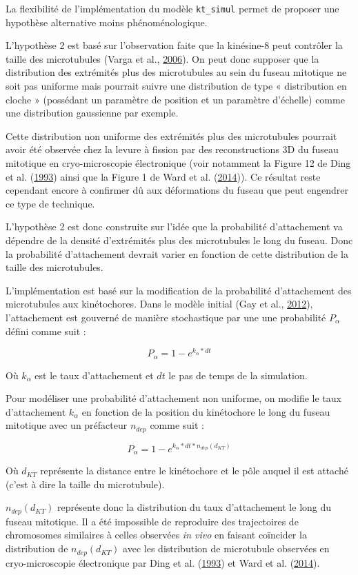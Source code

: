 \documentclass[12pt,a4paper,twoside,openright]{book}
\begin{document}
La flexibilité de l'implémentation du modèle \texttt{kt\_simul} permet
de proposer une hypothèse alternative moins phénoménologique.

L'hypothèse 2 est basé sur l'observation faite que la kinésine-8 peut
contrôler la taille des microtubules (Varga et al.,
\hyperref[ref-Varga2006]{2006}). On peut donc supposer que la
distribution des extrémités plus des microtubules au sein du fuseau
mitotique ne soit pas uniforme mais pourrait suivre une distribution de
type « distribution en cloche » (possédant un paramètre de position et
un paramètre d'échelle) comme une distribution gaussienne par exemple.

Cette distribution non uniforme des extrémités plus des microtubules
pourrait avoir été observée chez la levure à fission par des
reconstructions 3D du fuseau mitotique en cryo-microscopie électronique
(voir notamment la Figure 12 de Ding et al.
(\hyperref[ref-Ding1993a]{1993}) ainsi que la Figure 1 de Ward et al.
(\hyperref[ref-Ward2014]{2014})). Ce résultat reste cependant encore à
confirmer dû aux déformations du fuseau que peut engendrer ce type de
technique.

L'hypothèse 2 est donc construite sur l'idée que la probabilité
d'attachement va dépendre de la densité d'extrémités plus des
microtubules le long du fuseau. Donc la probabilité d'attachement
devrait varier en fonction de cette distribution de la taille des
microtubules.

L'implémentation est basé sur la modification de la probabilité
d'attachement des microtubules aux kinétochores. Dans le modèle initial
(Gay et al., \hyperref[ref-Gay2012a]{2012}), l'attachement est gouverné
de manière stochastique par une une probabilité \(P_{\alpha}\) défini
comme suit :

\[
P_{\alpha} = 1 - e^{k_{\alpha}*dt}
\]

Où \(k_{\alpha}\) est le taux d'attachement et \(dt\) le pas de temps de
la simulation.

Pour modéliser une probabilité d'attachement non uniforme, on modifie le
taux d'attachement \(k_{\alpha}\) en fonction de la position du
kinétochore le long du fuseau mitotique avec un préfacteur \(n_{dep}\)
comme suit :

\[
P_{\alpha} = 1 - e^{k_{\alpha}*dt*n_{dep}(d_{KT})}
\]

Où \(d_{KT}\) représente la distance entre le kinétochore et le pôle
auquel il est attaché (c'est à dire la taille du microtubule).

\(n_{dep}(d_{KT})\) représente donc la distribution du taux
d'attachement le long du fuseau mitotique. Il a été impossible de
reproduire des trajectoires de chromosomes similaires à celles observées
\emph{in vivo} en faisant coïncider la distribution de
\(n_{dep}(d_{KT})\) avec les distribution de microtubule observées en
cryo-microscopie électronique par Ding et al.
(\hyperref[ref-Ding1993a]{1993}) et Ward et al.
(\hyperref[ref-Ward2014]{2014}).
\end{document}
